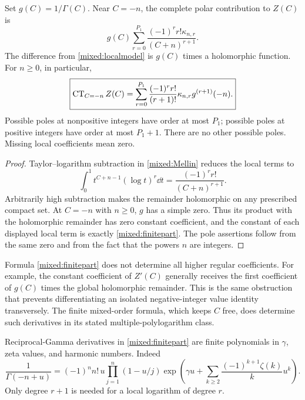\begin{theorem}
\label{mixed:localtheorem}
Set $g(C)=1/\Gamma(C)$. Near $C=-n$, the complete polar contribution
to $Z(C)$ is
\begin{equation}\label{mixed:localmodel}
        g(C)\sum_{r=0}^{P_1}
              \frac{(-1)^r r!\kappa_{n,r}}{(C+n)^{r+1}}.
\end{equation}
The difference from \eqref{mixed:localmodel} is $g(C)$ times a
holomorphic function. For $n\ge0$, in particular,
\begin{equation}\label{mixed:finitepart}
 \boxed{\displaystyle
 \operatorname{CT}_{C=-n} Z(C)=
     \sum_{r=0}^{P_1}\frac{(-1)^r r!}{(r+1)!}
                           \kappa_{n,r}g^{(r+1)}(-n).}
\end{equation}
Possible poles at nonpositive integers have order at most $P_1$;
possible poles at positive integers have order at most $P_1+1$.
There are no other possible poles. Missing local coefficients mean zero.
\end{theorem}
\begin{proof}
Taylor--logarithm subtraction in \eqref{mixed:Mellin} reduces the
local terms to
\[
 \int_0^1t^{C+n-1}(\log t)^r\dd t
                  =\frac{(-1)^r r!}{(C+n)^{r+1}}.
\]
Arbitrarily high subtraction makes the remainder holomorphic on any
prescribed compact set. At $C=-n$ with $n\ge0$, $g$ has a simple
zero. Thus its product with the holomorphic remainder has zero
constant coefficient, and the constant of each displayed local term
is exactly \eqref{mixed:finitepart}. The pole assertions follow from
the same zero and from the fact that the powers $n$ are integers.
\end{proof}

Formula \eqref{mixed:finitepart} does not determine all higher
regular coefficients. For example, the constant coefficient of
$Z'(C)$ generally receives the first coefficient of $g(C)$ times
the global holomorphic remainder. This is the same obstruction that
prevents differentiating an isolated negative-integer value identity
transversely. The finite mixed-order formula, which keeps $C$ free,
does determine such derivatives in its stated multiple-polylogarithm
class.

Reciprocal-Gamma derivatives in \eqref{mixed:finitepart} are finite
polynomials in $\gamma$, zeta values, and harmonic numbers. Indeed
\begin{equation}\label{mixed:reciprocalgamma}
 \frac1{\Gamma(-n+u)}=
       (-1)^n n!\,u\prod_{j=1}^n(1-u/j)
       \exp\left(\gamma u+
             \sum_{k\ge2}\frac{(-1)^{k+1}\zeta(k)}k u^k\right).
\end{equation}
Only degree $r+1$ is needed for a local logarithm of degree $r$.


